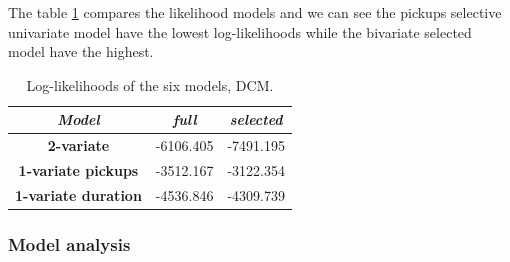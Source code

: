 The  table \ref{Log-likelihoods DCM} compares the likelihood models and we can see the pickups selective univariate model have the lowest log-likelihoods while the bivariate selected model have the highest.
\begin{table}
	\centering
	\renewcommand\arraystretch{1.3}
	\begin{tabular}{c|c|c}
		\hline
		\textit{Model} &\textit{full } & \textit{selected} \\ 
		\hline
		\textbf{2-variate } & -6106.405  & -7491.195    \\ 
		\hline
		\textbf{1-variate pickups } & -3512.167  & -3122.354    \\ 
		\hline
		\textbf{1-variate duration} & -4536.846  & -4309.739   \\ 
		\hline
	\end{tabular}
	\caption[Log-likelihoods of the six models (DCM)]{Log-likelihoods of the six models, DCM.}
	\label{Log-likelihoods DCM}
\end{table}



\subsubsection{Model analysis}


